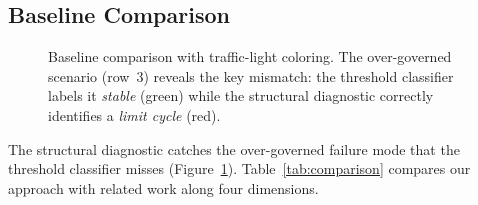 \documentclass[sigconf,nonacm]{acmart}
\begin{document}
\subsection{Baseline Comparison}\label{sec:baseline}

\begin{figure}[t]
  \centering
  \caption{Baseline comparison with traffic-light coloring. The
    over-governed scenario (row~3) reveals the key mismatch:
    the threshold classifier labels it \emph{stable} (green) while the
    structural diagnostic correctly identifies a \emph{limit cycle} (red).}
  \label{fig:baseline}
\end{figure}

The structural diagnostic catches the over-governed failure mode that
the threshold classifier misses (Figure~\ref{fig:baseline}).
Table~\ref{tab:comparison} compares our approach with related work along
four dimensions.
\end{document}
